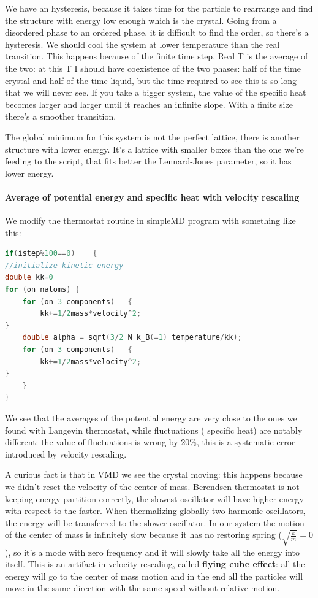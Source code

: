 \documentclass[a4paper, italian, openany]{book}
\begin{document}
\medskip

We have an hysteresis, because it takes time for the particle to rearrange and find the structure with energy low enough which is the crystal. Going from a disordered phase to an ordered phase, it is difficult to find the order, so there's a hysteresis.\newline
We should cool the system at lower temperature than the real transition. This happens because of the finite time step. Real T is the average of the two: at this T I should have coexistence of the two phases: half of the time crystal and half of the time liquid, but the time required to see this is so long that we will never see.\newline
If you take a bigger system, the value of the specific heat becomes larger and larger until it reaches an infinite slope. With a finite size there's a smoother transition.

\medskip

The global minimum for this system is not the perfect lattice, there is another structure with lower energy. It's a lattice with smaller boxes than the one we're feeding to the script, that fits better the Lennard-Jones parameter, so it has lower energy.

\paragraph{Average of potential energy and specific heat with velocity rescaling}

We modify the thermostat routine in simpleMD program with something like this:

\begin{lstlisting}[language=C]
if(istep%100==0) 	{
//initialize kinetic energy
double kk=0
for (on natoms) {
	for (on 3 components)	{
		kk+=1/2mass*velocity^2;
}
	double alpha = sqrt(3/2 N k_B(=1) temperature/kk);
	for (on 3 components)	{
		kk+=1/2mass*velocity^2;
}
	}
}
\end{lstlisting}

We see that the averages of the potential energy are very close to the ones we found with Langevin thermostat, while fluctuations ( specific heat) are notably different: the value of fluctuations is wrong by 20\%, this is a systematic error introduced by velocity rescaling.

\medskip

A curious fact is that in VMD we see the crystal moving: this happens because we didn't reset the velocity of the center of mass. Berendsen thermostat is not keeping energy partition correctly, the slowest oscillator will have higher energy with respect to the faster. When thermalizing globally two harmonic oscillators, the energy will be transferred to the slower oscillator. In our system the motion of the center of mass is infinitely slow because it has no restoring spring ($\sqrt{\frac{k}{m}}=0$), so it's a mode with zero frequency and it will slowly take all the energy into itself. This is an artifact in velocity rescaling, called \textbf{flying cube effect}: all the energy will go to the center of mass motion and in the end all the particles will move in the same direction with the same speed without relative motion.
\end{document}
